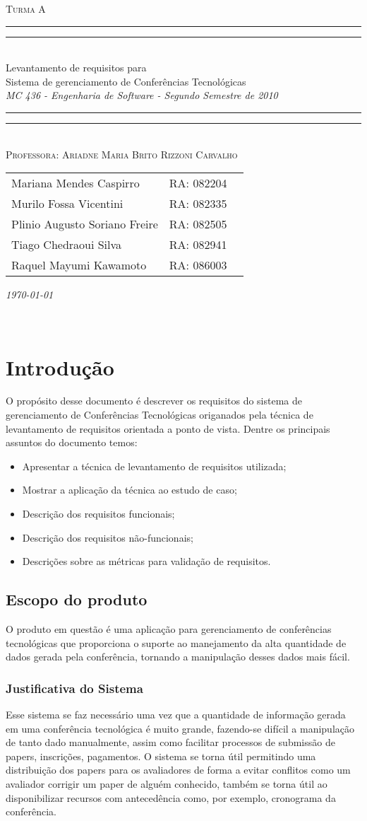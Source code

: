 \documentclass[letter]{article}
\newcommand*{\titleTMB}{\begingroup \centering \settowidth{\unitlength}{\LARGE MC 613} \vspace*{\baselineskip} {\large\scshape  Turma A}\\[\baselineskip] \rule{11.0cm}{1.6pt}\vspace*{-\baselineskip}\vspace*{2pt} \rule{11.0cm}{0.4pt}\\[\baselineskip] {\LARGE Levantamento de requisitos para }\\[0.2\baselineskip] {\LARGE Sistema de gerenciamento de Conferências Tecnológicas }\\[0.2\baselineskip] {\itshape MC 436 - Engenharia de Software - Segundo Semestre de 2010}\\[0.2\baselineskip] \rule{11.0cm}{0.4pt}\vspace*{-\baselineskip}\vspace{3.2pt} \rule{11.0cm}{1.6pt}\\[\baselineskip] {\large\scshape Professora: Ariadne Maria Brito Rizzoni Carvalho}\par \vfill {\normalsize   \scshape 
    \begin{center} 
      \begin{tabular}{  l  l  p{5cm} } 
        Mariana Mendes Caspirro & RA: 082204\\
        Murilo Fossa Vicentini & RA: 082335 \\
        Plinio Augusto Soriano Freire & RA:  082505\\
        Tiago Chedraoui Silva  & RA: 082941\\
Raquel Mayumi Kawamoto & RA: 086003 \\    
  \end{tabular} \end{center}
    \itshape \today }\\[\baselineskip] \vspace{3.2pt} \endgroup}
\begin{document}
\titleTMB 
\newpage


\tableofcontents

\newpage

\section{Introdução}
O propósito desse documento é descrever os requisitos do sistema
de gerenciamento de Conferências Tecnológicas
origanados pela técnica de levantamento de requisitos orientada a ponto de vista.
Dentre os principais assuntos do documento temos:

\begin{itemize}
\item Apresentar a técnica de levantamento de requisitos utilizada;
\item Mostrar a aplicação da técnica ao estudo de caso;
\item Descrição dos requisitos funcionais;
\item Descrição dos requisitos não-funcionais;
\item Descrições sobre as métricas para validação de requisitos.
\end{itemize}

\subsection{Escopo do produto }

O produto em questão é uma aplicação para gerenciamento de conferências tecnológicas que proporciona o suporte ao manejamento da alta quantidade de dados gerada pela conferência, tornando a manipulação desses dados mais fácil.
\subsubsection{Justificativa do Sistema}

Esse sistema se faz necessário uma vez que a quantidade de informação gerada em uma conferência tecnológica é muito grande, fazendo-se difícil a manipulação de tanto dado manualmente, assim como facilitar processos de submissão de papers, inscrições, pagamentos. O sistema se torna útil permitindo uma distribuição dos papers para os avaliadores de forma a evitar conflitos como um avaliador corrigir um paper de alguém conhecido, também se torna útil ao disponibilizar recursos com antecedência como, por exemplo, cronograma da conferência.
\end{document}

